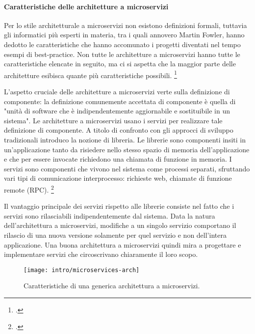 \paragraph{Caratteristiche delle architetture a microservizi}
\label{par:microservizi-intro}

Per lo stile architetturale a microservizi non esistono definizioni formali, tuttavia gli informatici più esperti in materia, tra i quali annovero Martin Fowler, hanno dedotto le caratteristiche che hanno accomunato i progetti diventati nel tempo esempi di best-practice.
Non tutte le architetture a microservizi hanno tutte le caratteristiche elencate in seguito, ma ci si aspetta che la maggior parte delle architetture esibisca quante più caratteristiche possibili.
\footcite{site:fowler-microservices}

L'aspetto cruciale delle architetture a microservizi verte sulla definizione di componente: la definizione comunemente accettata di componente è quella di "unità di software che è indipendentemente aggiornabile e sostituibile in un sistema".
Le architetture a microservizi usano i servizi per realizzare tale definizione di componente. A titolo di confronto con gli approcci di sviluppo tradizionali introduco la nozione di libreria.
Le librerie sono componenti insiti in un'applicazione tanto da risiedere nello stesso spazio di memoria dell'applicazione e che per essere invocate richiedono una chiamata di funzione in memoria.
I servizi sono componenti che vivono nel sistema come processi separati, sfruttando vari tipi di comunicazione interprocesso: richieste web, chiamate di funzione remote (RPC).
\footcite{site:fowler-microservices}

Il vantaggio principale dei servizi rispetto alle librerie consiste nel fatto che i servizi sono rilasciabili indipendentemente dal sistema.
Data la natura dell'architettura a microservizi, modifiche a un singolo servizio comportano il rilascio di una nuova versione solamente per quel servizio e non dell'intera applicazione.
Una buona architettura a microservizi quindi mira a progettare e implementare servizi che circoscrivano chiaramente il loro scopo.

\begin{figure}[H]
    \centering
    \texttt{[image: intro/microservices-arch]}
    \caption{Caratteristiche di una generica architettura a microservizi.\\ \cite{site:fowler-microservices}}
    \label{fig:microservices-arch}
\end{figure}


